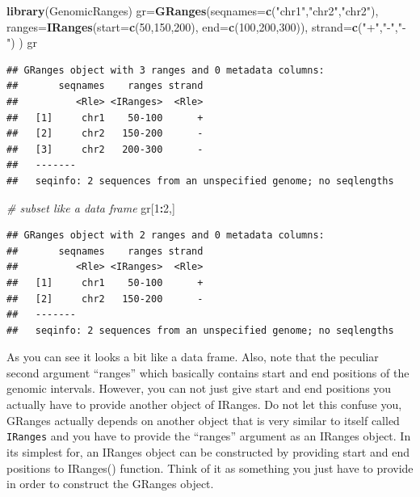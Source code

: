\documentclass[12pt,]{krantz}
\newenvironment{Shaded}{\begin{snugshade}}{\end{snugshade}}
\newcommand{\CommentTok}[1]{\textcolor[rgb]{0.56,0.35,0.01}{\textit{#1}}}
\newcommand{\DataTypeTok}[1]{\textcolor[rgb]{0.13,0.29,0.53}{#1}}
\newcommand{\DecValTok}[1]{\textcolor[rgb]{0.00,0.00,0.81}{#1}}
\newcommand{\KeywordTok}[1]{\textcolor[rgb]{0.13,0.29,0.53}{\textbf{#1}}}
\newcommand{\NormalTok}[1]{#1}
\newcommand{\OperatorTok}[1]{\textcolor[rgb]{0.81,0.36,0.00}{\textbf{#1}}}
\newcommand{\StringTok}[1]{\textcolor[rgb]{0.31,0.60,0.02}{#1}}
\begin{document}
\begin{Shaded}
\begin{Highlighting}[]
\KeywordTok{library}\NormalTok{(GenomicRanges)}
\NormalTok{gr=}\KeywordTok{GRanges}\NormalTok{(}\DataTypeTok{seqnames=}\KeywordTok{c}\NormalTok{(}\StringTok{"chr1"}\NormalTok{,}\StringTok{"chr2"}\NormalTok{,}\StringTok{"chr2"}\NormalTok{),}
           \DataTypeTok{ranges=}\KeywordTok{IRanges}\NormalTok{(}\DataTypeTok{start=}\KeywordTok{c}\NormalTok{(}\DecValTok{50}\NormalTok{,}\DecValTok{150}\NormalTok{,}\DecValTok{200}\NormalTok{),}
                          \DataTypeTok{end=}\KeywordTok{c}\NormalTok{(}\DecValTok{100}\NormalTok{,}\DecValTok{200}\NormalTok{,}\DecValTok{300}\NormalTok{)),}
           \DataTypeTok{strand=}\KeywordTok{c}\NormalTok{(}\StringTok{"+"}\NormalTok{,}\StringTok{"-"}\NormalTok{,}\StringTok{"-"}\NormalTok{)}
\NormalTok{)}
\NormalTok{gr}
\end{Highlighting}
\end{Shaded}

\begin{verbatim}
## GRanges object with 3 ranges and 0 metadata columns:
##       seqnames    ranges strand
##          <Rle> <IRanges>  <Rle>
##   [1]     chr1    50-100      +
##   [2]     chr2   150-200      -
##   [3]     chr2   200-300      -
##   -------
##   seqinfo: 2 sequences from an unspecified genome; no seqlengths
\end{verbatim}

\begin{Shaded}
\begin{Highlighting}[]
\CommentTok{# subset like a data frame}
\NormalTok{gr[}\DecValTok{1}\OperatorTok{:}\DecValTok{2}\NormalTok{,]}
\end{Highlighting}
\end{Shaded}

\begin{verbatim}
## GRanges object with 2 ranges and 0 metadata columns:
##       seqnames    ranges strand
##          <Rle> <IRanges>  <Rle>
##   [1]     chr1    50-100      +
##   [2]     chr2   150-200      -
##   -------
##   seqinfo: 2 sequences from an unspecified genome; no seqlengths
\end{verbatim}

As you can see it looks a bit like a data frame. Also, note that the peculiar second argument ``ranges'' which basically contains start and end positions of the genomic intervals. However, you can not just give start and end positions you actually have to provide another object of IRanges. Do not let this confuse you, GRanges actually depends on another object that is very similar to itself called \texttt{IRanges} and you have to provide the ``ranges'' argument as an IRanges object. In its simplest for, an IRanges object can be constructed by providing start and end positions to IRanges() function. Think of it as something you just have to provide in order to construct the GRanges object.
\end{document}
